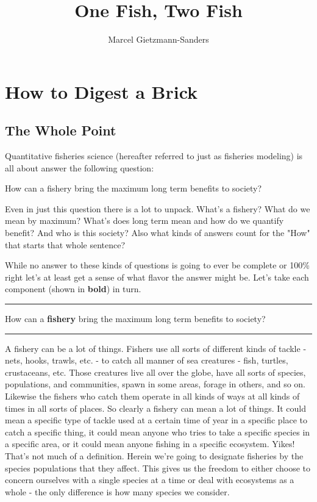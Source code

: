 \documentclass[11pt,a5paper]{book}
\title{One Fish, Two Fish}
\author{Marcel Gietzmann-Sanders}
\date{}
\begin{document}
\maketitle
\tableofcontents
\newpage
\chapter{How to Digest a Brick}

\section{The Whole Point}

Quantitative fisheries science (hereafter referred to just as fisheries modeling) is all about answer the following question:
\newline

 \hangindent=1cm \noindent How can a fishery bring the maximum long term benefits to society?
\newline

Even in just this question there is a lot to unpack. What's a fishery? What do we mean by maximum? What's does long term mean and how do we quantify benefit? And who is this society? Also what kinds of answers count for the "How" that starts that whole sentence? 
\newline

While no answer to these kinds of questions is going to ever be complete or 100\% right let's at least get a sense of what flavor the answer might be. Let's take each component (shown in \textbf{bold}) in turn.
\newpage

\noindent \rule{\textwidth}{0.5pt} 
\noindent How can a \textbf{fishery} bring the maximum long term benefits to society?
\newline
\rule{\textwidth}{0.5pt} 
\vspace{5pt}

A fishery can be a lot of things. Fishers use all sorts of different kinds of tackle - nets, hooks, trawls, etc. - to catch all manner of sea creatures - fish, turtles, crustaceans, etc. Those creatures live all over the globe, have all sorts of species, populations, and communities, spawn in some areas, forage in others, and so on. Likewise the fishers who catch them operate in all kinds of ways at all kinds of times in all sorts of places. So clearly a fishery can mean a lot of things. It could mean a specific type of tackle used at a certain time of year in a specific place to catch a specific thing, it could mean anyone who tries to take a specific species in a specific area, or it could mean anyone fishing in a specific ecosystem. Yikes! That's not much of a definition. Herein we're going to designate fisheries by the species populations that they affect. This gives us the freedom to either choose to concern ourselves with a single species at a time or deal with ecosystems as a whole - the only difference is how many species we consider. 
\newpage
\end{document}

